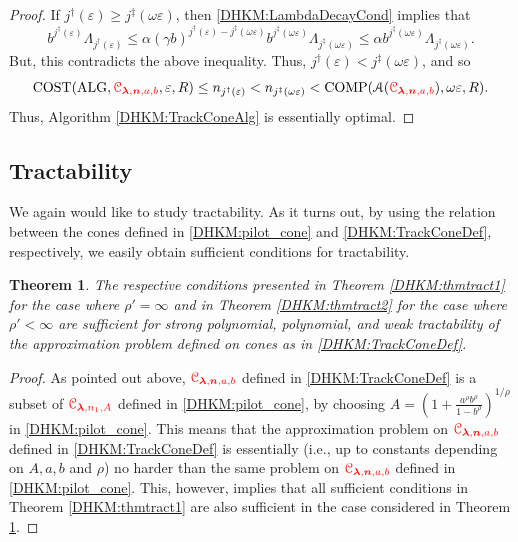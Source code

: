 \documentclass[USenglish]{article}
\theoremstyle{dgthm}
\newtheorem{theorem}{Theorem}
\theoremstyle{dgthm}
\theoremstyle{dgthm}
\theoremstyle{dgthm}
\theoremstyle{dgdef}
\theoremstyle{definition}
\DeclareMathOperator{\ALG}{ALG}
\DeclareMathOperator{\COST}{COST}
\DeclareMathOperator{\COMP}{COMP}
\newcommand{\DHKMchange}[1]{{\color{red}{#1}}}
\begin{document}
\begin{proof}
If $j^{\dagger}(\varepsilon) \ge j^{\ddagger}(\omega \varepsilon)$, then \eqref{DHKM:LambdaDecayCond} implies that 
\[
 b^{j^\dagger(\varepsilon)} \Lambda_{j^\dagger(\varepsilon) } \le \alpha (\gamma b)^{j^{\dagger}(\varepsilon) - j^{\ddagger}(\omega \varepsilon)} b^{j^{\ddagger}(\omega \varepsilon) } \Lambda_{j^\ddagger(\omega \varepsilon) } \le \alpha b^{j^{\ddagger}(\omega \varepsilon) } \Lambda_{j^\ddagger(\omega \varepsilon) }.
\]
But, this contradicts the above inequality.  Thus, $j^\dagger(\varepsilon) < j^\ddagger(\omega \varepsilon)$, and so
\[
\COST(\ALG,\DHKMchange{\calC_{\boldsymbol{\lambda},\bsn,a,b}},\varepsilon,R) \le n_{j^\dagger(\varepsilon)} < n_{j^\ddagger(\omega \varepsilon)} < \COMP(\calA(\DHKMchange{\calC_{\boldsymbol{\lambda},\bsn,a,b}}),\omega \varepsilon,R).
\]
Thus,  Algorithm \ref{DHKM:TrackConeAlg} is essentially optimal.
\end{proof}




\subsection{Tractability}\label{DHKM:SecDecayTract}



We again would like to study tractability. As it turns out, by using the relation 
between the cones defined in \eqref{DHKM:pilot_cone} and \eqref{DHKM:TrackConeDef}, respectively, we 
easily obtain sufficient conditions for tractability. 

\begin{theorem} \label{DHKM:thmtract3}
The respective conditions presented in Theorem \ref{DHKM:thmtract1} for the case where $\rho'=\infty$ and 
in Theorem \ref{DHKM:thmtract2} for the case where $\rho'<\infty$ are sufficient for strong polynomial, polynomial, and weak tractability of the approximation problem defined on cones as in \eqref{DHKM:TrackConeDef}.
\end{theorem}
\begin{proof}
As pointed out above, $\DHKMchange{\calC_{\boldsymbol{\lambda},\bsn,a,b}}$ defined in \eqref{DHKM:TrackConeDef} is a subset of  $\DHKMchange{\calC_{\boldsymbol{\lambda},n_1,A}}$ defined in \eqref{DHKM:pilot_cone}, by choosing $A=\left(1 + \frac{a^\rho b^\rho}{1 - b^\rho} \right)^{1/\rho}$ in \eqref{DHKM:pilot_cone}. This means that the approximation problem on  $\DHKMchange{\calC_{\boldsymbol{\lambda},\bsn,a,b}}$ defined in \eqref{DHKM:TrackConeDef} is essentially (i.e., up to constants depending on $A,a,b$ and $\rho$) no harder than the same problem on $\DHKMchange{\calC_{\boldsymbol{\lambda},\bsn,a,b}}$ defined in \eqref{DHKM:pilot_cone}. This, however, implies that all sufficient conditions in Theorem \ref{DHKM:thmtract1} are also sufficient in the case considered in Theorem \ref{DHKM:thmtract3}.
\end{proof}
\end{document}
